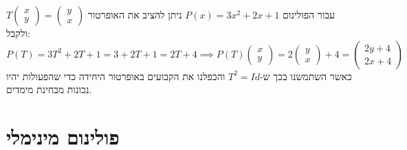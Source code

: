 \documentclass{tstextbook}
\begin{document}
\begin{example}
עבור הפולינום \(P(x)=3x^{2}+2x+1\) ניתן להציב את האופרטור \(T\begin{pmatrix}x\\y\end{pmatrix}=\begin{pmatrix}y\\x\end{pmatrix}\) ולקבל:
$$P(T)=3T^2+2T+1=3+2T+1=2T+4\implies P(T)\begin{pmatrix}x \\ y\end{pmatrix}=2\begin{pmatrix}y \\ x\end{pmatrix}+4=\begin{pmatrix}2y + 4 \\ 2x + 4
\end{pmatrix}$$
כאשר השתמשנו בכך ש-\(T^{2}=Id\) והכפלנו את הקבועים באופרטור היחידה כדי שהפעולות יהיו נכונות מבחינת מימדים.

\end{example}
\section{פולינום מינימלי}
\end{document}
